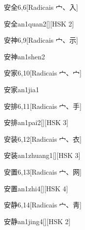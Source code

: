 \begin{entry}{安全}{6,6}[Radicais ⼧、⼊]
  \begin{phonetics}{安全}{an1quan2}[][HSK 2]
  \end{phonetics}
\end{entry}

\begin{entry}{安神}{6,9}[Radicais ⼧、⽰]
  \begin{phonetics}{安神}{an1shen2}
  \end{phonetics}
\end{entry}

\begin{entry}{安家}{6,10}[Radicais ⼧、⼧]
  \begin{phonetics}{安家}{an1jia1}
  \end{phonetics}
\end{entry}

\begin{entry}{安排}{6,11}[Radicais ⼧、⼿]
  \begin{phonetics}{安排}{an1pai2}[][HSK 3]
  \end{phonetics}
\end{entry}

\begin{entry}{安装}{6,12}[Radicais ⼧、⾐]
  \begin{phonetics}{安装}{an1zhuang1}[][HSK 3]
  \end{phonetics}
\end{entry}

\begin{entry}{安置}{6,13}[Radicais ⼧、⽹]
  \begin{phonetics}{安置}{an1zhi4}[][HSK 4]
  \end{phonetics}
\end{entry}

\begin{entry}{安静}{6,14}[Radicais ⼧、⾭]
  \begin{phonetics}{安静}{an1jing4}[][HSK 2]
  \end{phonetics}
\end{entry}

